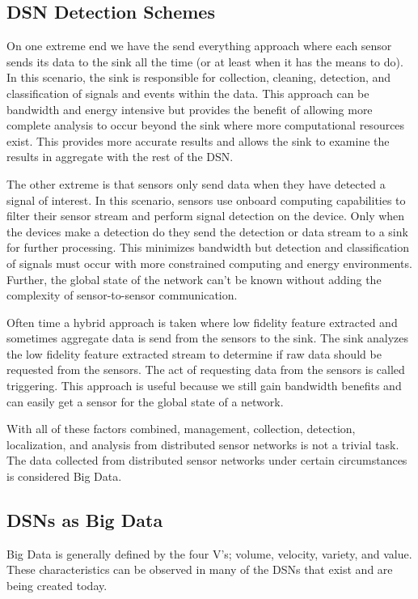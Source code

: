 \subsection{DSN Detection Schemes}
On one extreme end we have the send everything approach where each sensor sends its data to the sink all the time (or at least when it has the means to do). In this scenario, the sink is responsible for collection, cleaning, detection, and classification of signals and events within the data. This approach can be bandwidth and energy intensive but provides the benefit of allowing more complete analysis to occur beyond the sink where more computational resources exist. This provides more accurate results and allows the sink to examine the results in aggregate with the rest of the DSN.

The other extreme is that sensors only send data when they have detected a signal of interest. In this scenario, sensors use onboard computing capabilities to filter their sensor stream and perform signal detection on the device. Only when the devices make a detection do they send the detection or data stream to a sink for further processing. This minimizes bandwidth but detection and classification of signals must occur with more constrained computing and energy environments. Further, the global state of the network can't be known without adding the complexity of sensor-to-sensor communication.

Often time a hybrid approach is taken where low fidelity feature extracted and sometimes aggregate data is send from the sensors to the sink. The sink analyzes the low fidelity feature extracted stream to determine if raw data should be requested from the sensors. The act of requesting data from the sensors is called triggering. This approach is useful because we still gain bandwidth benefits and can easily get a sensor for the global state of a network.

With all of these factors combined, management, collection, detection, localization, and analysis from distributed sensor networks is not a trivial task. The data collected from distributed sensor networks under certain circumstances is considered Big Data. 

\subsection{DSNs as Big Data}
Big Data is generally defined by the four V's; volume, velocity, variety, and value. These characteristics can be observed in many of the DSNs that exist and are being created today. %

